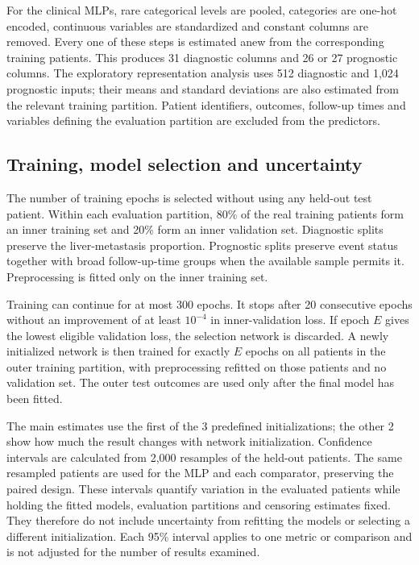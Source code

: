 For the clinical MLPs, rare categorical levels are pooled, categories are
one-hot encoded, continuous variables are standardized and constant columns are
removed.  Every one of these steps is estimated anew from the corresponding
training patients.  This produces 31 diagnostic columns and 26 or 27 prognostic
columns.  The exploratory representation analysis uses 512 diagnostic and
1,024 prognostic inputs; their means and standard deviations are also estimated
from the relevant training partition.  Patient identifiers, outcomes,
follow-up times and variables defining the evaluation partition are excluded
from the predictors.

\subsection{Training, model selection and uncertainty}
\label{sec:mlp:selection}

The number of training epochs is selected without using any held-out test
patient.  Within each evaluation partition, 80\% of the real training patients
form an inner training set and 20\% form an inner validation set.  Diagnostic
splits preserve the liver-metastasis proportion.  Prognostic splits preserve
event status together with broad follow-up-time groups when the available
sample permits it.  Preprocessing is fitted only on the inner training set.

Training can continue for at most 300 epochs.  It stops after 20 consecutive
epochs without an improvement of at least $10^{-4}$ in inner-validation loss.
If epoch $E$ gives the lowest eligible validation loss, the selection network is
discarded.  A newly initialized network is then trained for exactly $E$ epochs
on all patients in the outer training partition, with preprocessing refitted on
those patients and no validation set.  The outer test outcomes are used only
after the final model has been fitted.

The main estimates use the first of the 3 predefined initializations; the other
2 show how much the result changes with network initialization.  Confidence
intervals are calculated from 2,000 resamples of the held-out patients.  The
same resampled patients are used for the MLP and each comparator, preserving the
paired design.  These intervals quantify variation in the evaluated patients
while holding the fitted models, evaluation partitions and censoring estimates
fixed.  They therefore do not include uncertainty from refitting the models or
selecting a different initialization.  Each 95\% interval applies to one metric
or comparison and is not adjusted for the number of results examined.

